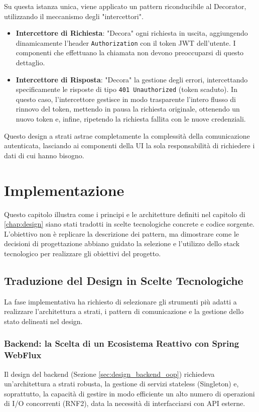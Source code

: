 \documentclass[12pt,a4paper,openright,twoside]{book}
\begin{document}
Su questa istanza unica, viene applicato un pattern riconducibile al Decorator, utilizzando il meccanismo degli "intercettori".
\begin{itemize}
    \item \textbf{Intercettore di Richiesta}: "Decora" ogni richiesta in uscita, aggiungendo dinamicamente l'header \texttt{Authorization} con il token JWT dell'utente. I componenti che effettuano la chiamata non devono preoccuparsi di questo dettaglio.
    \item \textbf{Intercettore di Risposta}: "Decora" la gestione degli errori, intercettando specificamente le risposte di tipo \texttt{401 Unauthorized} (token scaduto). In questo caso, l'intercettore gestisce in modo trasparente l'intero flusso di rinnovo del token, mettendo in pausa la richiesta originale, ottenendo un nuovo token e, infine, ripetendo la richiesta fallita con le nuove credenziali.
\end{itemize}
Questo design a strati astrae completamente la complessità della comunicazione autenticata, lasciando ai componenti della UI la sola responsabilità di richiedere i dati di cui hanno bisogno.

\chapter{Implementazione}
\label{chap:implementazione}

Questo capitolo illustra come i principi e le architetture definiti nel capitolo di \ref{chap:design} siano stati tradotti in scelte tecnologiche concrete e codice sorgente. L'obiettivo non è replicare la descrizione dei pattern, ma dimostrare come le decisioni di progettazione abbiano guidato la selezione e l'utilizzo dello stack tecnologico per realizzare gli obiettivi del progetto.

\section{Traduzione del Design in Scelte Tecnologiche}
\label{sec:impl_tech_choices}

La fase implementativa ha richiesto di selezionare gli strumenti più adatti a realizzare l'architettura a strati, i pattern di comunicazione e la gestione dello stato delineati nel design.

\subsection{Backend: la Scelta di un Ecosistema Reattivo con Spring WebFlux}
Il design del backend (Sezione \ref{sec:design_backend_oop}) richiedeva un'architettura a strati robusta, la gestione di servizi stateless (Singleton) e, soprattutto, la capacità di gestire in modo efficiente un alto numero di operazioni di I/O concorrenti (RNF2), data la necessità di interfacciarsi con API esterne.
\end{document}
